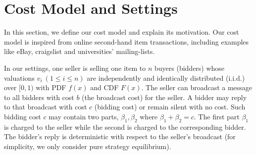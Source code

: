 \section{Cost Model and Settings}

In this section, we define our cost model and explain its motivation. Our
cost model is inspired from online second-hand item transactions, including
examples like eBay, craigslist and universities' mailing-lists.


\begin{definition}\label{def:model}

In our settings, one seller is selling one item to $n$ buyers (bidders)
whose valuations $v_i~(1 \leq i \leq n)$ are independently and identically
distributed (i.i.d.) over $[0, 1)$ with PDF $f(x)$ and CDF $F(x)$. The seller
can broadcast a message to all bidders with cost $b$ (the broadcast cost) for
the seller.  A bidder may reply to that broadcast with cost $c$ (bidding cost)
or remain silent with no cost. Such bidding cost $c$ may contain two parts,
$\beta_1, \beta_2$ where $\beta_1+\beta_2 = c$.  The first part $\beta_1$ is
charged to the seller while the second is charged to the corresponding bidder.
The bidder's reply is deterministic with respect to the seller's
broadcast (for simplicity, we only consider pure strategy equilibrium).

\end{definition}

%

